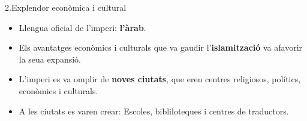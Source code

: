 \documentclass{beamer}
\begin{document}
\begin{frame}{2.Explendor econòmica i cultural}
   	
\begin{itemize}

\itemsep1pt\parskip0pt
    \item  Llengua oficial de l'imperi: \textbf{l'àrab}.
    \item  Els avantatges econòmics i culturals que va gaudir  l'\textbf{islamització} va afavorir la seua expansió.
    \item  L'imperi es va omplir de \textbf{noves ciutats}, que eren centres  religiosos, polítics, econòmics i culturals.
    \item  A les ciutats es varen crear: Escoles, bibliloteques i centres de  traductors.
\end{itemize}

\end{frame}
\end{document}

